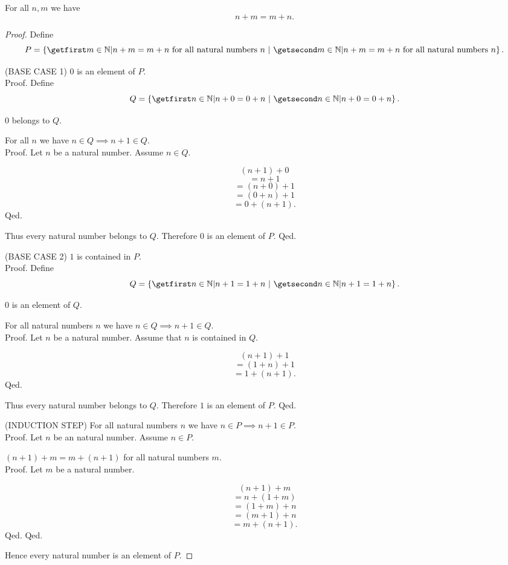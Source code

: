 \documentclass[../../arithmetic.tex]{subfiles}
\begin{document}
  \begin{forthel}
    \begin{proposition}\label{Arithmetic_01_02_273100}
      For all $n,m$ we have \[ n + m = m + n. \]
    \end{proposition}
    \begin{proof}
      Define \[ P = \class{m \in \Nat | \text{$n + m = m + n$ for all natural numbers $n$}}. \]

      (BASE CASE 1) $0$ is an element of $P$. \\
      Proof.
        Define \[ Q = \class{n \in \Nat | n + 0 = 0 + n}. \]

        $0$ belongs to $Q$.

        For all $n$ we have $n \in Q \implies n + 1 \in Q$. \\
        Proof.
          Let $n$ be a natural number.
          Assume $n \in Q$.

          \[   (n + 1) + 0 \]
          \[ = n + 1 \]        %
          \[ = (n + 0) + 1 \]  %
          \[ = (0 + n) + 1 \]  %
          \[ = 0 + (n + 1). \] %
        Qed.

        Thus every natural number belongs to $Q$.
        Therefore $0$ is an element of $P$.
      Qed.

      (BASE CASE 2) $1$ is contained in $P$. \\
      Proof.
        Define \[ Q = \class{n \in \Nat | n + 1 = 1 + n}. \]

        $0$ is an element of $Q$.

        For all natural numbers $n$ we have $n \in Q \implies n + 1 \in Q$. \\
        Proof.
          Let $n$ be a natural number.
          Assume that $n$ is contained in $Q$.

          \[   (n + 1) + 1 \]
          \[ = (1 + n) + 1 \]  %
          \[ = 1 + (n + 1). \] %
        Qed.

        Thus every natural number belongs to $Q$.
        Therefore $1$ is an element of $P$.
      Qed.

      (INDUCTION STEP) For all natural numbers $n$ we have $n \in P \implies n + 1 \in P$. \\
      Proof.
        Let $n$ be an natural number.
        Assume $n \in P$.

        $(n + 1) + m = m + (n + 1)$ for all natural numbers $m$. \\
        Proof.
          Let $m$ be a natural number.

          \[   (n + 1) + m \]
          \[ = n + (1 + m) \]  %
          \[ = (1 + m) + n \]  %
          \[ = (m + 1) + n \]  %
          \[ = m + (n + 1). \] %
        Qed.
      Qed.

      Hence every natural number is an element of $P$.
    \end{proof}
  \end{forthel}
\end{document}

